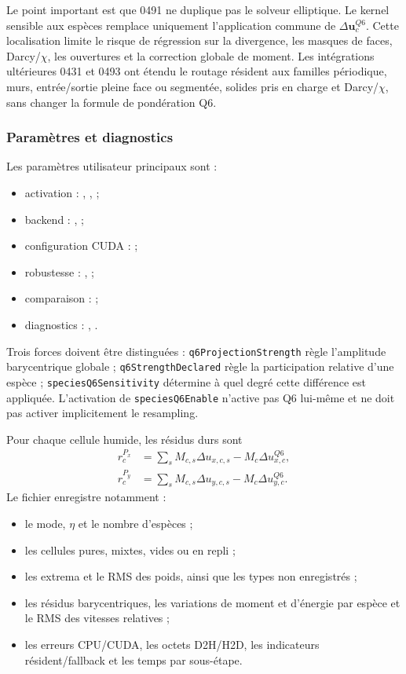 \documentclass[11pt,a4paper]{article}
\begin{document}
Le point important est que 0491 ne duplique pas le solveur elliptique. Le kernel sensible aux espèces remplace uniquement l'application commune de $\Delta\bm{u}^{Q6}_c$. Cette localisation limite le risque de régression sur la divergence, les masques de faces, Darcy/$\chi$, les ouvertures et la correction globale de moment. Les intégrations ultérieures 0431 et 0493 ont étendu le routage résident aux familles périodique, murs, entrée/sortie pleine face ou segmentée, solides pris en charge et Darcy/$\chi$, sans changer la formule de pondération Q6.

\subsubsection{Paramètres et diagnostics}

Les paramètres utilisateur principaux sont :
\begin{itemize}[nosep]
  \item activation : , ,  ;
  \item backend : ,  ;
  \item configuration CUDA :  ;
  \item robustesse : ,  ;
  \item comparaison :  ;
  \item diagnostics : , .
\end{itemize}

Trois forces doivent être distinguées : \texttt{q6ProjectionStrength} règle l'amplitude barycentrique globale ; \texttt{q6StrengthDeclared} règle la participation relative d'une espèce ; \texttt{speciesQ6Sensitivity} détermine à quel degré cette différence est appliquée. L'activation de \texttt{speciesQ6Enable} n'active pas Q6 lui-même et ne doit pas activer implicitement le resampling.

Pour chaque cellule humide, les résidus durs sont
\begin{align}
  r^{P_x}_c&=\sum_sM_{c,s}\Delta u_{x,c,s}
             -M_c\Delta u^{Q6}_{x,c},\\
  r^{P_y}_c&=\sum_sM_{c,s}\Delta u_{y,c,s}
             -M_c\Delta u^{Q6}_{y,c}.
\end{align}
Le fichier  enregistre notamment :
\begin{itemize}[nosep]
  \item le mode, $\eta$ et le nombre d'espèces ;
  \item les cellules pures, mixtes, vides ou en repli ;
  \item les extrema et le RMS des poids, ainsi que les types non enregistrés ;
  \item les résidus barycentriques, les variations de moment et d'énergie par espèce et le RMS des vitesses relatives ;
  \item les erreurs CPU/CUDA, les octets D2H/H2D, les indicateurs résident/fallback et les temps par sous-étape.
\end{itemize}
\end{document}
